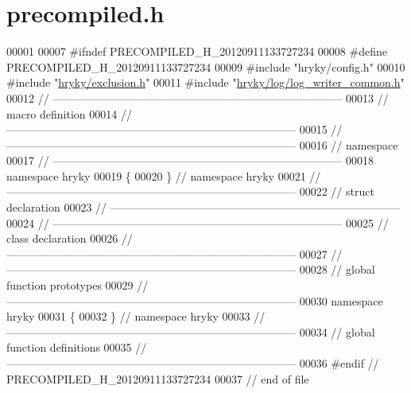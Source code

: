 \hypertarget{exclusion_2src_2precompiled_8h_source}{\section{precompiled.\-h}
}

\begin{DoxyCode}
00001 
00007 \textcolor{preprocessor}{#ifndef PRECOMPILED\_H\_20120911133727234}
00008 \textcolor{preprocessor}{}\textcolor{preprocessor}{#define PRECOMPILED\_H\_20120911133727234}
00009 \textcolor{preprocessor}{}\textcolor{preprocessor}{#include "hryky/config.h"}
00010 \textcolor{preprocessor}{#include "\hyperlink{exclusion_8h}{hryky/exclusion.h}"}
00011 \textcolor{preprocessor}{#include "\hyperlink{log__writer__common_8h}{hryky/log/log_writer_common.h}"}
00012 \textcolor{comment}{//
      ------------------------------------------------------------------------------}
00013 \textcolor{comment}{// macro definition}
00014 \textcolor{comment}{//
      ------------------------------------------------------------------------------}
00015 \textcolor{comment}{//
      ------------------------------------------------------------------------------}
00016 \textcolor{comment}{// namespace}
00017 \textcolor{comment}{//
      ------------------------------------------------------------------------------}
00018 \textcolor{keyword}{namespace }hryky
00019 \{
00020 \} \textcolor{comment}{// namespace hryky}
00021 \textcolor{comment}{//
      ------------------------------------------------------------------------------}
00022 \textcolor{comment}{// struct declaration}
00023 \textcolor{comment}{//
      ------------------------------------------------------------------------------}
00024 \textcolor{comment}{//
      ------------------------------------------------------------------------------}
00025 \textcolor{comment}{// class declaration}
00026 \textcolor{comment}{//
      ------------------------------------------------------------------------------}
00027 \textcolor{comment}{//
      ------------------------------------------------------------------------------}
00028 \textcolor{comment}{// global function prototypes}
00029 \textcolor{comment}{//
      ------------------------------------------------------------------------------}
00030 \textcolor{keyword}{namespace }hryky
00031 \{
00032 \} \textcolor{comment}{// namespace hryky}
00033 \textcolor{comment}{//
      ------------------------------------------------------------------------------}
00034 \textcolor{comment}{// global function definitions}
00035 \textcolor{comment}{//
      ------------------------------------------------------------------------------}
00036 \textcolor{preprocessor}{#endif // PRECOMPILED\_H\_20120911133727234}
00037 \textcolor{preprocessor}{}\textcolor{comment}{// end of file}
\end{DoxyCode}
